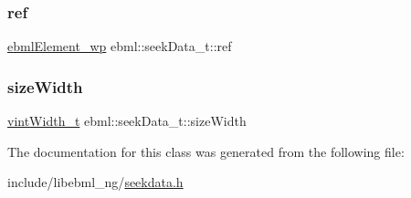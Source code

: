 \subsubsection{\texorpdfstring{ref}{ref}}
{\footnotesize\ttfamily \mbox{\hyperlink{namespaceebml_a495fb58b42b0050d887415351af02935}{ebml\+Element\+\_\+wp}} ebml\+::seek\+Data\+\_\+t\+::ref}

\mbox{\label{classebml_1_1seekData__t_aaebccafee18298ba365b784acbc6df6b}} 
\subsubsection{\texorpdfstring{size\+Width}{sizeWidth}}
{\footnotesize\ttfamily \mbox{\hyperlink{namespaceebml_a2ccdfb60b23efb51fe07f9d066e23604}{vint\+Width\+\_\+t}} ebml\+::seek\+Data\+\_\+t\+::size\+Width}



The documentation for this class was generated from the following file\+:\begin{DoxyCompactItemize}
\item 
include/libebml\+\_\+ng/\mbox{\hyperlink{seekdata_8h}{seekdata.\+h}}\end{DoxyCompactItemize}
